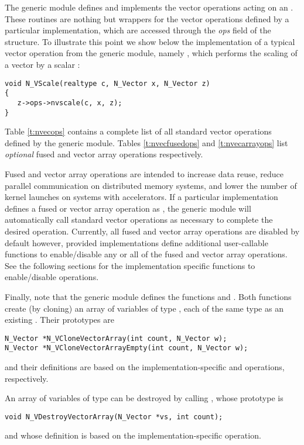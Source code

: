 The generic {\nvector} module defines and implements the vector operations 
acting on an .
These routines are nothing but wrappers for the vector operations defined by
a particular {\nvector} implementation, which are accessed through the {\em ops}
field of the  structure. To illustrate this point we
show below the implementation of a typical vector operation from the
generic {\nvector} module, namely , which performs the scaling of a
vector  by a scalar :
\begin{verbatim}
void N_VScale(realtype c, N_Vector x, N_Vector z) 
{
   z->ops->nvscale(c, x, z);
}
\end{verbatim}
Table \ref{t:nvecops} contains a complete list of all standard vector operations defined
by the generic {\nvector} module. Tables \ref{t:nvecfusedops} and \ref{t:nvecarrayops}
list \textit{optional} fused and vector array operations respectively.

Fused and vector array operations are intended to increase data reuse, reduce
parallel communication on distributed memory systems, and lower the number of
kernel launches on systems with accelerators. If a particular {\nvector}
implementation defines a fused or vector array operation as , the
generic {\nvector} module will automatically call standard vector operations as
necessary to complete the desired operation. Currently, all fused and vector
array operations are disabled by default however, {\sundials} provided {\nvector}
implementations define additional user-callable functions to enable/disable
any or all of the fused and vector array operations. See the following sections
for the implementation specific functions to enable/disable operations.

Finally, note that the generic {\nvector} module defines the functions
 and .  Both functions
create (by cloning) an array of  variables of type , each
of the same type as an existing . Their prototypes are
\begin{verbatim}
N_Vector *N_VCloneVectorArray(int count, N_Vector w);
N_Vector *N_VCloneVectorArrayEmpty(int count, N_Vector w);
\end{verbatim}
and their definitions are based on the implementation-specific  and
 operations, respectively.

An array of variables of type  can be destroyed by
calling , whose prototype is
\begin{verbatim}
void N_VDestroyVectorArray(N_Vector *vs, int count);
\end{verbatim}
and whose definition is based on the implementation-specific  operation.


